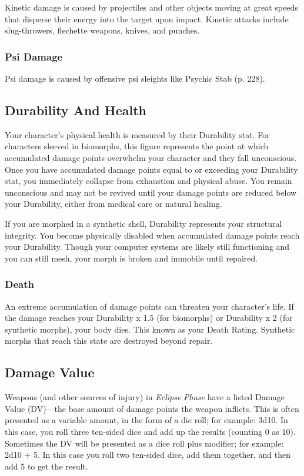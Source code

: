 Kinetic damage is caused by projectiles and other 
objects moving at great speeds that disperse their 
energy into the target upon impact. Kinetic attacks 
include slug-throwers, flechette weapons, knives, 
and punches.

\subsubsection{Psi Damage}

Psi damage is caused by offensive psi sleights like 
Psychic Stab (p. 228).

\subsection{Durability And Health}

Your character's physical health is measured by their 
Durability stat. For characters sleeved in biomorphs, 
this figure represents the point at which accumulated
damage points overwhelm your character and
they fall unconscious. Once you have accumulated 
damage points equal to or exceeding your Durability 
stat, you immediately collapse from exhaustion and 
physical abuse. You remain unconscious and may 
not be revived until your damage points are reduced 
below your Durability, either from medical care or 
natural healing.

If you are morphed in a synthetic shell, Durability
represents your structural integrity. You become
physically disabled when accumulated damage points 
reach your Durability. Though your computer systems 
are likely still functioning and you can still mesh, your 
morph is broken and immobile until repaired.

\subsubsection{Death}

An extreme accumulation of damage points can 
threaten your character's life. If the damage reaches 
your Durability x 1.5 (for biomorphs) or Durability x 
2 (for synthetic morphs), your body dies. This known 
as your Death Rating. Synthetic morphs that reach 
this state are destroyed beyond repair.

\subsection{Damage Value}

Weapons (and other sources of injury) in \textit{Eclipse }
\textit{Phase} have a listed Damage Value (DV)—the base 
amount of damage points the weapon inflicts. This is 
often presented as a variable amount, in the form of a 
die roll; for example: 3d10. In this case, you roll three 
ten-sided dice and add up the results (counting 0 as 
10). Sometimes the DV will be presented as a dice roll 
plus modifier; for example: 2d10 + 5. In this case you 
roll two ten-sided dice, add them together, and then 
add 5 to get the result.

